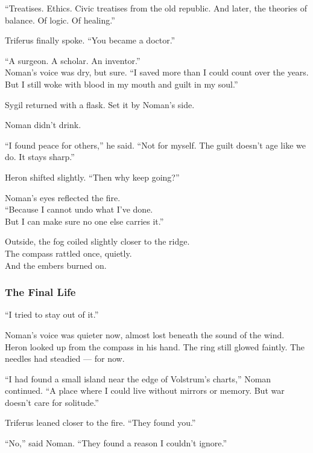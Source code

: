 \documentclass[12pt]{article}
\begin{document}
“Treatises. Ethics. Civic treatises from the old republic. And later, the theories of balance. Of logic. Of healing.”

Triferus finally spoke. “You became a doctor.”

“A surgeon. A scholar. An inventor.”\\
Noman’s voice was dry, but sure. “I saved more than I could count over the years. But I still woke with blood in my mouth and guilt in my soul.”

\vspace{1em}

Sygil returned with a flask. Set it by Noman’s side.

Noman didn’t drink.

“I found peace for others,” he said. “Not for myself. The guilt doesn’t age like we do. It stays sharp.”

Heron shifted slightly. “Then why keep going?”

\vspace{1em}

Noman’s eyes reflected the fire.\\
“Because I cannot undo what I’ve done.\\
But I can make sure no one else carries it.”

\vspace{1em}

Outside, the fog coiled slightly closer to the ridge.\\
The compass rattled once, quietly.\\
And the embers burned on.

\dotfill

\subsubsection{The Final Life}

“I tried to stay out of it.”

Noman’s voice was quieter now, almost lost beneath the sound of the wind.\\
Heron looked up from the compass in his hand. The ring still glowed faintly. The needles had steadied — for now.

“I had found a small island near the edge of Volstrum’s charts,” Noman continued. “A place where I could live without mirrors or memory. But war doesn’t care for solitude.”

Triferus leaned closer to the fire. “They found you.”

“No,” said Noman. “They found a reason I couldn’t ignore.”
\end{document}
